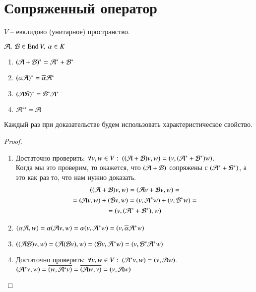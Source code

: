 \documentclass[main]{subfiles}
\begin{document}
\chapter{Сопряженный оператор}


$V$ -- евклидово (унитарное) пространство.

\begin{proposition}
    $\mathcal{A}, \ \mathcal{B} \in \operatorname{End} V, \ \alpha \in K$
    \begin{enumerate}
        \item $(\mathcal{A} + \mathcal{B})^* = \mathcal{A}^* + \mathcal{B}^*$
        \item $(\alpha \mathcal{A})^* = \overline{\alpha} \mathcal{A}^*$
        \item $(\mathcal{A} \mathcal{B})^* = \mathcal{B}^* \mathcal{A}^*$
        \item $\mathcal{A}^{**} = \mathcal{A}$
    \end{enumerate}
\end{proposition}

Каждый раз при доказательстве будем использовать характеристическое свойство.

\begin{proof}
    \begin{enumerate}
        \item Достаточно проверить: $\forall v, w \in V: \ ((\mathcal{A} + \mathcal{B})v, w) = (v, (\mathcal{A}^* + \mathcal{B}^*) w)$. \\
              Когда мы это проверим, то окажется, что $(\mathcal{A} + \mathcal{B})$ сопряжены с $(\mathcal{A}^* + \mathcal{B}^*)$, а это как раз то, что нам нужно доказать.
              \begin{multline*}
                  ((\mathcal{A} + \mathcal{B})v, w) = (\mathcal{A} v + \mathcal{B} v, w) = \\
                  = (\mathcal{A} v, w) + (\mathcal{B} v, w) = (v, \mathcal{A}^* w) + (v, \mathcal{B}^* w) = \\
                  = (v, (\mathcal{A}^* + \mathcal{B}^*), w)
              \end{multline*}
        \item

              $(\alpha \mathcal{A}, w) = \alpha(\mathcal{A} v, w) = \alpha(v, \mathcal{A}^* w) = (v, \overline{\alpha} \mathcal{A}^* w)$

        \item  $((\mathcal{A} \mathcal{B})v, w)= (\mathcal{A}(\mathcal{B} v), w) = (\mathcal{B} v, \mathcal{A}^* w) = (v, \mathcal{B}^* \mathcal{A}^* w) $
        \item Достаточно проверить: $\forall v, w \in V: \ (\mathcal{A}^* v, w) = (v,\mathcal{A} w)$. \\
              $(\mathcal{A}^* v, w) = \overline{(w, \mathcal{A}^* v)} = \overline{(\mathcal{A} w, v)} = (v, \mathcal{A} w) $
    \end{enumerate}
\end{proof}
\end{document}
